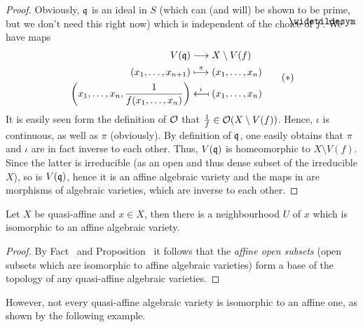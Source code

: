 \documentclass[a4paper,parskip=half,numbers=enddot, DIV=12]{scrreprt}
\begin{document}
	\begin{proof}
		Obviously, $\mathfrak{q}$ is an ideal in $S$ (which can (and will) be shown to be prime, but we don't need this right now) which is independent of the choice of $\snake f$. We have maps
		\begin{align}\lbl{eq:prop2.2.4star}
			\begin{split}
				V(\qq) &\longto X\setminus V(f)\\
				(x_1,\ldots, x_{n+1}) &\overset{\pi}{\longmapsto} (x_1,\ldots, x_n) \\
				\left(x_1, \ldots, x_n, \frac{1}{f(x_1,\ldots,x_n)}\right)& \overset{\iota}{\longmapsfrom}(x_1,\ldots, x_n)
			\end{split}\tag{$*$}
		\end{align}
		It is easily seen form the definition of $\mathcal{O}$ that $\frac{1}{f}\in \mathcal{O}(X\setminus V(f))$. Hence, $\iota$ is continuous, as well as $\pi$ (obviously). By definition of $\mathfrak{q}$, one easily obtains that $\pi$ and $\iota$ are in fact inverse to each other. Thus, $V(\mathfrak{q})$ is homeomorphic to $X\setminus V(f)$. Since the latter is irreducible (as an open and thus dense subset of the irreducible $X$), so is $V(\mathfrak{q})$, hence it is an affine algebraic variety and the maps in  are morphisms of algebraic varieties, which are inverse to each other.
	\end{proof}
	\begin{cor}
		Let $X$ be quasi-affine and $x\in X$, then there is a neighbourhood $U$ of $x$ which is isomorphic to an affine algebraic variety.
	\end{cor}
	\begin{proof}
		By Fact~ and Proposition~ it follows that the \emph{affine open subsets} (open subsets which are isomorphic to affine algebraic varieties) form a base of the topology of any quasi-affine algebraic varieties.
	\end{proof}
	However, not every quasi-affine algebraic variety is isomorphic to an affine one, as shown by the following example.
\end{document}

